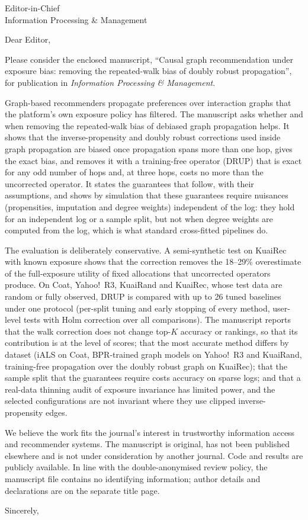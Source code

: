 \documentclass[11pt]{letter}
\begin{document}
\begin{letter}{Editor-in-Chief\\Information Processing \& Management}
\opening{Dear Editor,}

Please consider the enclosed manuscript, ``Causal graph recommendation under exposure bias: removing the repeated-walk bias of doubly robust propagation'', for publication in
\emph{Information Processing \& Management}.

Graph-based recommenders propagate preferences over interaction graphs that the
platform's own exposure policy has filtered. The manuscript asks whether and when removing
the repeated-walk bias of debiased graph propagation helps. It shows that the
inverse-propensity and doubly robust corrections used inside graph propagation are
biased once propagation spans more than one hop, gives the exact bias, and removes it
with a training-free operator (DRUP) that is exact for any odd number of hops and, at
three hops, costs no more than the uncorrected operator. It states the guarantees that
follow, with their assumptions, and shows by simulation that these guarantees require
nuisances (propensities, imputation and degree weights) independent of the log: they hold
for an independent log or a sample split, but not when degree weights are computed from the
log, which is what standard cross-fitted pipelines do.

The evaluation is deliberately conservative. A semi-synthetic test on KuaiRec
with known exposure shows that the correction removes the 18--29\% overestimate
of the full-exposure utility of fixed allocations that uncorrected operators
produce. On Coat, Yahoo!\ R3, KuaiRand and KuaiRec, whose test data are random
or fully observed, DRUP is compared with up to 26 tuned baselines under one
protocol (per-split tuning and early stopping of every method, user-level tests
with Holm correction over all comparisons). The manuscript reports that the walk
correction does not change top-$K$ accuracy or rankings, so that its
contribution is at the level of scores; that the most accurate method differs
by dataset (iALS on Coat, BPR-trained graph models on Yahoo!\ R3 and KuaiRand,
training-free propagation over the doubly robust graph on KuaiRec); that the
sample split that the guarantees require costs accuracy on sparse logs; and that
a real-data thinning audit of exposure invariance has limited power, and the
selected configurations are not invariant where they use clipped inverse-propensity edges.

We believe the work fits the journal's interest in trustworthy information
access and recommender systems. The manuscript is original, has not been
published elsewhere and is not under consideration by another journal. Code and
results are publicly available. In line with the double-anonymised review
policy, the manuscript file contains no identifying information; author details
and declarations are on the separate title page.

\closing{Sincerely,}
\end{letter}
\end{document}
